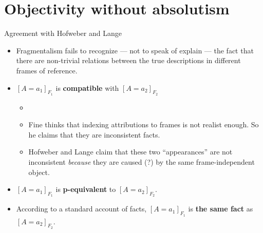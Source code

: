 \documentclass[fleqn]{beamer}
\begin{document}
\section{Objectivity without absolutism}





\begin{frame}{Agreement with Hofweber and Lange}

  \begin{itemize}
  \item Fragmentalism fails to recognize --- not to speak of explain
    --- the fact that there are non-trivial relations between the true
    descriptions in different frames of reference.
  \item $[A=a_1]_{F_1}$ is \textbf{compatible} with $[A=a_2]_{F_2}$
    \begin{itemize}
    \item \item Fine thinks that indexing attributions to frames is
      not realist enough. So he claims that they are inconsistent
      facts. \end{itemize}
    \begin{itemize}
    \item Hofweber and Lange claim that these two ``appearances'' are
      not inconsistent \textit{because} they are caused (?) by the
      same frame-independent object.
    \end{itemize}
  \item $[A=a_1]_{F_1}$ is \textbf{p-equivalent} to $[A=a_2]_{F_2}$.
  \item According to a standard account of facts, $[A=a_1]_{F_1}$ is
    \textbf{the same fact} as $[A=a_2]_{F_2}$.
  \end{itemize}


\end{frame}


\end{document}
